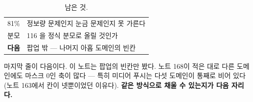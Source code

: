 \documentclass[10pt]{article}
\begin{document}

\begin{table}[t]
\centering\tsize
\caption{남은 것.}
\begin{tabular}{ll}
\toprule
81\% & 정보량 문제인지 눈금 문제인지 못 가른다 \\
분모 & 116 을 정식 분모로 올릴 것인가 \\
\textbf{다음} & 팝업 밖 --- 나머지 아홉 도메인의 빈칸 \\
\bottomrule
\end{tabular}
\end{table}

마지막 줄이 다음이다. 이 노트는 팝업의 빈칸만 봤다. 노트 168이 적은 대로
다른 도메인에도 마스크 0인 축이 많다 --- 특히 미디어 푸시는 다섯 도메인이
통째로 비어 있다(노트 163에서 칸이 넷뿐이었던 이유다). \textbf{같은 방식으로
채울 수 있는지가 다음 자리다.}
\end{document}
